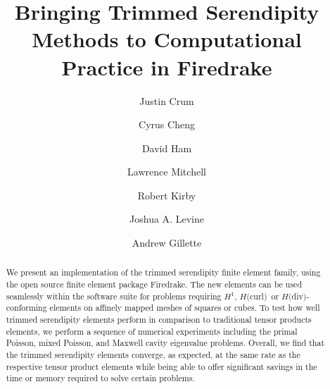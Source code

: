 \documentclass[manuscript,screen]{acmart}
\newcommand{\hcurl}{$H($curl$)$}
\newcommand{\hdiv}{$H($div$)$}
\begin{document}
\title{Bringing Trimmed Serendipity Methods to Computational Practice in Firedrake}


\author{Justin Crum}

\author{Cyrus Cheng}

\author{David Ham}

\author{Lawrence Mitchell}

\author{Robert Kirby}

\author{Joshua A. Levine}

\author{Andrew Gillette}


\begin{abstract}
       We present an implementation of the trimmed serendipity finite element family, using the open source finite element package Firedrake.  The new elements can be used seamlessly within the software suite for problems requiring $H^1$, \hcurl~or \hdiv-conforming elements on affinely mapped meshes of squares or cubes.  To test how well trimmed serendipity elements perform in comparison to traditional tensor products elements, we perform a sequence of numerical experiments including the primal Poisson, mixed Poisson, and Maxwell cavity eigenvalue problems.  Overall, we find that the trimmed serendipity elements converge, as expected, at the same rate as the respective tensor product elements while being able to offer significant savings in the time or memory required to solve certain problems.
\end{abstract}
  
\end{document}
